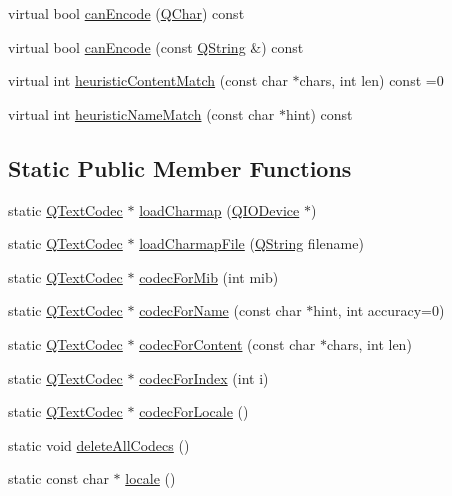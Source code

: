 \begin{DoxyCompactItemize}
\item 
virtual bool \mbox{\hyperlink{class_q_text_codec_afaf92c1195d9432cfeccd63aa7983c9a}{can\+Encode}} (\mbox{\hyperlink{class_q_char}{Q\+Char}}) const
\item 
virtual bool \mbox{\hyperlink{class_q_text_codec_a02a5132a63fb0f8a7bd733f256e96d28}{can\+Encode}} (const \mbox{\hyperlink{class_q_string}{Q\+String}} \&) const
\item 
virtual int \mbox{\hyperlink{class_q_text_codec_a4780a608d950994a927de727bb07b9fe}{heuristic\+Content\+Match}} (const char $\ast$chars, int len) const =0
\item 
virtual int \mbox{\hyperlink{class_q_text_codec_a1bcf2f11fac6113fd6ae74dda55b2ca4}{heuristic\+Name\+Match}} (const char $\ast$hint) const
\end{DoxyCompactItemize}
\subsection*{Static Public Member Functions}
\begin{DoxyCompactItemize}
\item 
static \mbox{\hyperlink{class_q_text_codec}{Q\+Text\+Codec}} $\ast$ \mbox{\hyperlink{class_q_text_codec_acf1f7d7dc7f47e434b269eb8efd458de}{load\+Charmap}} (\mbox{\hyperlink{class_q_i_o_device}{Q\+I\+O\+Device}} $\ast$)
\item 
static \mbox{\hyperlink{class_q_text_codec}{Q\+Text\+Codec}} $\ast$ \mbox{\hyperlink{class_q_text_codec_a655a88489c4308af769f992617a5ec53}{load\+Charmap\+File}} (\mbox{\hyperlink{class_q_string}{Q\+String}} filename)
\item 
static \mbox{\hyperlink{class_q_text_codec}{Q\+Text\+Codec}} $\ast$ \mbox{\hyperlink{class_q_text_codec_a4706a5d4023d048cc1c655dfa2b16e68}{codec\+For\+Mib}} (int mib)
\item 
static \mbox{\hyperlink{class_q_text_codec}{Q\+Text\+Codec}} $\ast$ \mbox{\hyperlink{class_q_text_codec_ade1d10ad04ecafc6d7ec54ba91ba7841}{codec\+For\+Name}} (const char $\ast$hint, int accuracy=0)
\item 
static \mbox{\hyperlink{class_q_text_codec}{Q\+Text\+Codec}} $\ast$ \mbox{\hyperlink{class_q_text_codec_aeb3ec365c6c4f1812689a2b66ed09e27}{codec\+For\+Content}} (const char $\ast$chars, int len)
\item 
static \mbox{\hyperlink{class_q_text_codec}{Q\+Text\+Codec}} $\ast$ \mbox{\hyperlink{class_q_text_codec_a84d9d45afc8d26c0b7d5b26f81c813bf}{codec\+For\+Index}} (int i)
\item 
static \mbox{\hyperlink{class_q_text_codec}{Q\+Text\+Codec}} $\ast$ \mbox{\hyperlink{class_q_text_codec_af21be033ce39428087bb853054f15ff5}{codec\+For\+Locale}} ()
\item 
static void \mbox{\hyperlink{class_q_text_codec_a4c333273ed9037228a03e8f3a850f431}{delete\+All\+Codecs}} ()
\item 
static const char $\ast$ \mbox{\hyperlink{class_q_text_codec_aafe5cdca0b371b80f87be4d6e131d4a8}{locale}} ()
\end{DoxyCompactItemize}
